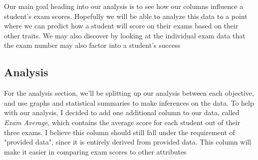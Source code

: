 \documentclass[14pt]{article}
\begin{document}
Our main goal heading into our analysis is to see how our columns influence a student's exam scores. Hopefully we will be able to analyze this data to a point where we can predict how a student will score on their exams based on their other traits. We may also discover by looking at the individual exam data that the exam number may also factor into a student's success \\ 

\subsection*{Analysis}
For the analysis section, we'll be splitting up our analysis between each objective, and use graphs and statistical summaries to make inferences on the data. To help with our analysis, I decided to add one additional column to our data, called \emph{Exam Average}, which contains the average score for each student out of their three exams. I believe this column should still fall under the requirement of "provided data", since it is entirely derived from provided data. This column will make it easier in comparing exam scores to other attributes \pagebreak
\end{document}
